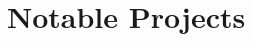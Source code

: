 
\section{Notable Projects}
    \vspace{3pt}
    \resumeSubHeadingListStart

    
    
    
    
      
    \resumeSubHeadingListEnd
